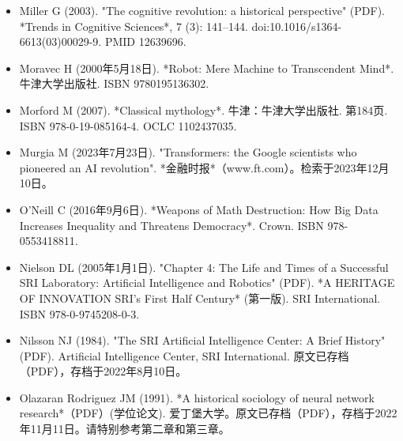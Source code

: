 \begin{itemize}
\item Miller G (2003). "The cognitive revolution: a historical perspective" (PDF). *Trends in Cognitive Sciences*, 7 (3): 141–144. doi:10.1016/s1364-6613(03)00029-9. PMID 12639696.  
\item Moravec H (2000年5月18日). *Robot: Mere Machine to Transcendent Mind*. 牛津大学出版社. ISBN 9780195136302.  
\item Morford M (2007). *Classical mythology*. 牛津：牛津大学出版社. 第184页. ISBN 978-0-19-085164-4. OCLC 1102437035.  
\item Murgia M (2023年7月23日). "Transformers: the Google scientists who pioneered an AI revolution". *金融时报*（www.ft.com）。检索于2023年12月10日。  
\item O'Neill C (2016年9月6日). *Weapons of Math Destruction: How Big Data Increases Inequality and Threatens Democracy*. Crown. ISBN 978-0553418811.  
\item Nielson DL (2005年1月1日). "Chapter 4: The Life and Times of a Successful SRI Laboratory: Artificial Intelligence and Robotics" (PDF). *A HERITAGE OF INNOVATION SRI's First Half Century* (第一版). SRI International. ISBN 978-0-9745208-0-3.  
\item Nilsson NJ (1984). "The SRI Artificial Intelligence Center: A Brief History" (PDF). Artificial Intelligence Center, SRI International. 原文已存档（PDF），存档于2022年8月10日。  
\item Olazaran Rodriguez JM (1991). *A historical sociology of neural network research*（PDF）(学位论文). 爱丁堡大学。原文已存档（PDF），存档于2022年11月11日。请特别参考第二章和第三章。


\end{itemize}
